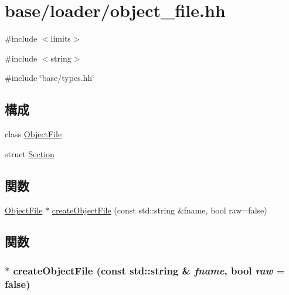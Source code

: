 \hypertarget{object__file_8hh}{
\section{base/loader/object\_\-file.hh}
\label{object__file_8hh}
}
{\ttfamily \#include $<$limits$>$}\par
{\ttfamily \#include $<$string$>$}\par
{\ttfamily \#include \char`\"{}base/types.hh\char`\"{}}\par
\subsection*{構成}
\begin{DoxyCompactItemize}
\item 
class \hyperlink{classObjectFile}{ObjectFile}
\item 
struct \hyperlink{structObjectFile_1_1Section}{Section}
\end{DoxyCompactItemize}
\subsection*{関数}
\begin{DoxyCompactItemize}
\item 
\hyperlink{classObjectFile}{ObjectFile} $\ast$ \hyperlink{object__file_8hh_ac4f6e291cd5c285cb87d080931522b75}{createObjectFile} (const std::string \&fname, bool raw=false)
\end{DoxyCompactItemize}


\subsection{関数}
\hypertarget{object__file_8hh_ac4f6e291cd5c285cb87d080931522b75}{
\subsubsection[{createObjectFile}]{$\ast$ createObjectFile (const std::string \& {\em fname}, \/  bool {\em raw} = {\ttfamily false})}}
\label{object__file_8hh_ac4f6e291cd5c285cb87d080931522b75}
